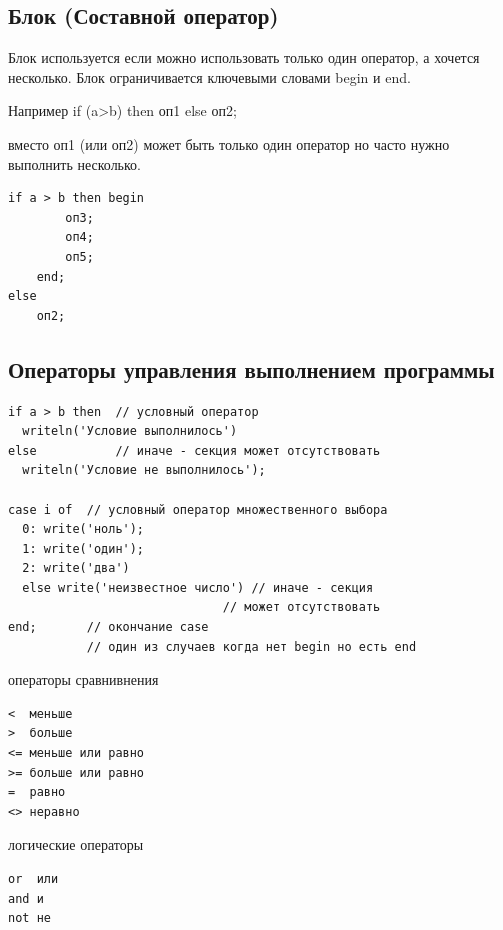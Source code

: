 \documentclass[unicode, 12pt, a4paper,oneside,fleqn]{article}
\begin{document}
\subsection{Блок (Составной оператор)}
Блок используется если можно использовать только один оператор, а
хочется несколько. Блок ограничивается ключевыми словами begin и end. 

Например if (a>b) then оп1 else оп2;

вместо оп1 (или оп2) может быть только один оператор но часто нужно
выполнить несколько.
\begin{verbatim}
if a > b then begin
        оп3;
        оп4;
        оп5;
    end;
else
    оп2;
\end{verbatim}




\subsection{Операторы управления выполнением программы}
\begin{verbatim}
if a > b then  // условный оператор
  writeln('Условие выполнилось')
else           // иначе - секция может отсутствовать
  writeln('Условие не выполнилось');

case i of  // условный оператор множественного выбора
  0: write('ноль');
  1: write('один');
  2: write('два')
  else write('неизвестное число') // иначе - секция
                              // может отсутствовать
end;       // окончание case
           // один из случаев когда нет begin но есть end
\end{verbatim}

операторы сравнивнения
\begin{verbatim}
<  меньше
>  больше
<= меньше или равно
>= больше или равно
=  равно
<> неравно
\end{verbatim}

логические операторы
\begin{verbatim}
or  или
and и
not не
\end{verbatim}
\end{document}
